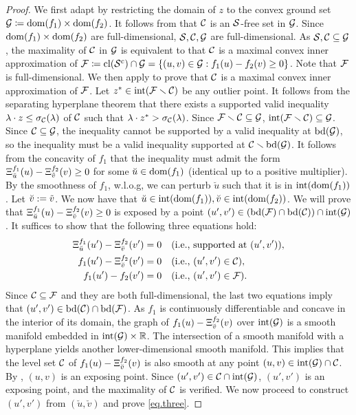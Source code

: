 \begin{proof}
	We first adapt  by restricting the domain of $z$ to the convex ground set $\mathcal G\coloneqq\operatorname{dom}(f_1) \times \operatorname{dom}(f_2)$. It follows from  that $\mathcal C$ is  an $\mathcal S$-free set in $\mathcal G$. Since $\operatorname{dom}(f_1) \times \operatorname{dom}(f_2)$ are full-dimensional, $\mathcal S,\mathcal C, \mathcal G$ are  full-dimensional. As $\mathcal S,\mathcal C \subseteq \mathcal G$, the maximality of $\mathcal C$ in $\mathcal G$ is equivalent to that $\mathcal C$ is a maximal convex inner approximation of $\mathcal F\coloneqq\operatorname{cl}(\mathcal S^c) \cap \mathcal G = \{(u,v) \in \mathcal G: f_1(u) -f_2(v) \ge 0\}$. Note that $\mathcal F$ is  full-dimensional. We then apply  to prove that $\mathcal C$ is a maximal convex inner approximation of $\mathcal F$.  Let \(z^\ast \in \operatorname{int}(\mathcal F \smallsetminus \mathcal C)\) be any outlier point. It follows from the separating hyperplane theorem that there exists a supported valid inequality $\lambda \cdot z \le \sigma_{\mathcal C}(\lambda)$  of $\mathcal C$ such that $\lambda \cdot z^\ast > \sigma_{\mathcal C}(\lambda)$. Since $\mathcal F \smallsetminus \mathcal C \subseteq \mathcal G$, $ \operatorname{int}(\mathcal F \smallsetminus \mathcal C) \subseteq \mathcal G$. Since $\mathcal C \subseteq \mathcal G$, the inequality cannot be supported by a valid inequality at $\operatorname{bd}(\mathcal G)$, so the inequality must be a valid inequality supported at $\mathcal C \smallsetminus \operatorname{bd}(\mathcal G)$. It follows from the concavity of $f_1$ that the inequality must admit the form ${\Xi^{f_1}_{\breve{u}}}(u) -{\Xi^{f_2}_{\tilde{v}}}(v) \ge 0$ for some $\breve{u} \in \operatorname{dom}(f_1)$ (identical up to a positive multiplier). By the smoothness of $f_1$, w.l.o.g, we can perturb $\breve{u}$ such that it is in $ \operatorname{int}(\operatorname{dom}(f_1))$. Let $\breve{v} := \tilde{v}$. We now have that $\breve{u} \in \operatorname{int}(\operatorname{dom}(f_1)), \breve{v} \in \operatorname{int}(\operatorname{dom}(f_2))$.  We will prove that ${\Xi^{f_1}_{\breve{u}}}(u) -{\Xi^{f_2}_{\breve{v}}}(v) \ge 0$ is exposed by a point $(u',v') \in (\operatorname{bd}(\mathcal F) \cap \operatorname{bd}(\mathcal C)) \cap \operatorname{int}(\mathcal G)$. It suffices to show that the following three equations hold:
	\begin{equation}
	\label{eq.three}
    	\begin{aligned}
        	{\Xi^{f_1}_{\breve{u}}}(u') -{\Xi^{f_2}_{\breve{v}}}(v') &= 0 \quad \textup{(i.e., supported at $(u',v')$)},\\
        	f_1(u') -{\Xi^{f_2}_{\breve{v}}}(v') &= 0  \quad \textup{(i.e., $(u',v') \in \mathcal C$)},\\
        	f_1(u') -f_2(v') &= 0 \quad  \textup{(i.e., $(u',v') \in \mathcal F$)}.
    	\end{aligned}
	\end{equation}
   Since $\mathcal C \subseteq \mathcal F$ and they  are both full-dimensional, the last two equations imply that $(u',v') \in \operatorname{bd}(\mathcal C) \cap \operatorname{bd}(\mathcal F)$. As $f_1$ is continuously differentiable and concave in the interior of its domain, the graph of $f_1(u) -{\Xi^{f_2}_{\breve{v}}}(v)$  over $\operatorname{int}(\mathcal G)$ is a smooth manifold embedded in $\operatorname{int}(\mathcal G) \times \mathbb R$. The intersection of a smooth manifold with a hyperplane yields another lower-dimensional smooth manifold. This implies that the  level set $\mathcal C$ of $f_1(u) -{\Xi^{f_2}_{\breve{v}}}(v)$ is also smooth at any point  $(u,v) \in \operatorname{int}(\mathcal G) \cap \mathcal C$. By , $(u,v)$  is an exposing point.  Since $(u',v') \in \mathcal C \cap  \operatorname{int}(\mathcal G)$, $(u',v')$ is an exposing point, and the maximality of $\mathcal C$ is verified. We now proceed to construct $(u',v')$ from $(\breve{u},\breve{v})$ and prove \eqref{eq.three}.

\end{proof}
